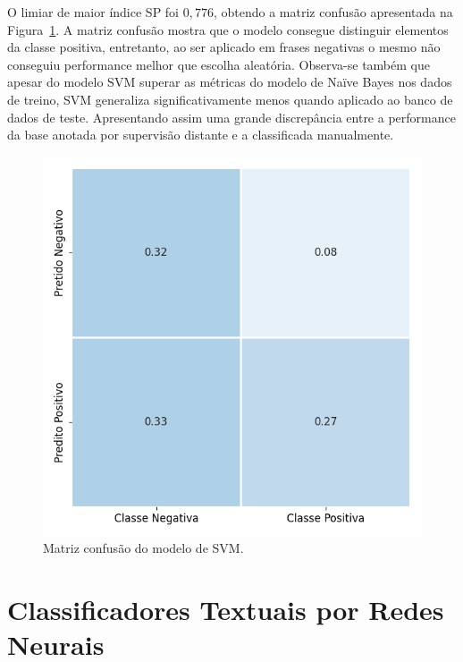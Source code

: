 O limiar de maior índice SP foi $0,776$, obtendo a matriz confusão
apresentada na Figura~\ref{fig:svm_confusion}.
A matriz confusão mostra que o modelo consegue distinguir elementos da classe
positiva, entretanto, ao ser aplicado em frases negativas o mesmo não conseguiu
performance melhor que escolha aleatória.
Observa-se também que apesar do modelo SVM superar as métricas do modelo de
Naïve Bayes nos dados de treino, SVM generaliza significativamente menos quando
aplicado ao banco de dados de teste.
Apresentando assim uma grande discrepância entre a performance da base anotada
por supervisão distante e a classificada manualmente.

\begin{figure}[h!]
\begin{center} {
    \begin{center}
    \includegraphics[scale=0.65]{images/svm_cm.png}
    \caption{Matriz confusão do modelo de SVM.}
    \label{fig:svm_confusion}
    \end{center}
}
\end{center}
\end{figure}


\section{Classificadores Textuais por Redes Neurais}


